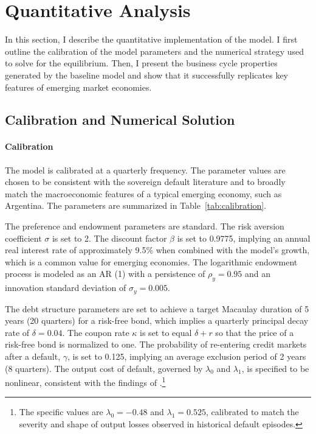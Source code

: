\documentclass[12pt]{article}
\theoremstyle{plain}
\begin{document}
\section{Quantitative Analysis}
\label{sec:quant}

In this section, I describe the quantitative implementation of the model. I
first outline the calibration of the model parameters and the numerical
strategy used to solve for the equilibrium. Then, I present the business cycle
properties generated by the baseline model and show that it successfully
replicates key features of emerging market economies.

\subsection{Calibration and Numerical Solution}

\paragraph{Calibration}
The model is calibrated at a quarterly frequency. The parameter values are
chosen to be consistent with the sovereign default literature and to broadly
match the macroeconomic features of a typical emerging economy, such as
Argentina. The parameters are summarized in Table~\ref{tab:calibration}.

The preference and endowment parameters are standard. The risk aversion
coefficient $\sigma$ is set to 2. The discount factor $\beta$ is set to 0.9775,
implying an annual real interest rate of approximately 9.5\% when combined with
the model's growth, which is a common value for emerging economies. The
logarithmic endowment process is modeled as an AR (1) with a persistence of
$\rho_y=0.95$ and an innovation standard deviation of $\sigma_y=0.005$.

The debt structure parameters are set to achieve a target Macaulay duration of
5 years (20 quarters) for a risk-free bond, which implies a quarterly principal
decay rate of $\delta=0.04$. The coupon rate $\kappa$ is set to equal
$\delta+r$ so that the price of a risk-free bond is normalized to one. The
probability of re-entering credit markets after a default, $\gamma$, is set to
0.125, implying an average exclusion period of 2 years (8 quarters). The output
cost of default, governed by $\lambda_0$ and $\lambda_1$, is specified to be
nonlinear, consistent with the findings of
\citet{ChatterjeeEyigungor2012}.\footnote{The specific values are $\lambda_0 =
		-0.48$ and $\lambda_1 = 0.525$, calibrated to match the severity and shape of
	output losses observed in historical default episodes.}
\end{document}
